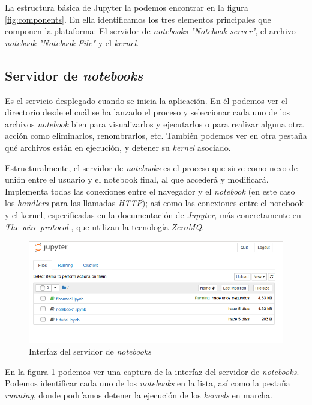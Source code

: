 \documentclass[11pt,spanish,listoffigures]{tfgetsinf}
\begin{document}
La estructura básica de Jupyter la podemos encontrar en la figura \ref{fig:components}. En ella identificamos los tres elementos principales que componen la plataforma: El servidor de \textit{notebooks "Notebook server"}, el archivo \textit{notebook "Notebook File"} y el \textit{kernel}. 


\subsection{Servidor de \textit{notebooks}}
\label{subsec:estructura-servidor}

Es el servicio desplegado cuando se inicia la aplicación. En él podemos ver el directorio desde el cuál se ha lanzado el proceso y seleccionar cada uno de los archivos \textit{notebook} bien para visualizarlos y ejecutarlos o para realizar alguna otra acción como eliminarlos, renombrarlos, etc.
 También podemos ver en otra pestaña qué archivos están en ejecución, y detener su \textit{kernel} asociado.
 
Estructuralmente, el servidor de \textit{notebooks} es el proceso que sirve como nexo de unión entre el usuario y el notebook final, al que accederá y modificará. Implementa todas las conexiones entre el navegador y el \textit{notebook} (en este caso los \textit{\gls{handler}s} para las llamadas \textit{\gls{HTTP}}); así como las conexiones entre el notebook y el kernel, especificadas en la documentación de \textit{Jupyter}, más concretamente en \textit{The wire protocol} \cite{wire-protocol}, que utilizan la tecnología \textit{ZeroMQ}.

\begin{figure}[h]
	\centering
  	\includegraphics[width=\linewidth]{tree.png}
  	\caption{Interfaz del servidor de \textit{notebooks}}
  	\label{fig:tree}
\end{figure}

En la figura \ref{fig:tree} podemos ver una captura de la interfaz del servidor de \textit{notebooks}. Podemos identificar cada uno de los \textit{notebooks} en la lista, así como la pestaña \textit{running}, donde podríamos detener la ejecución de los \textit{kernels} en marcha.
\end{document}
